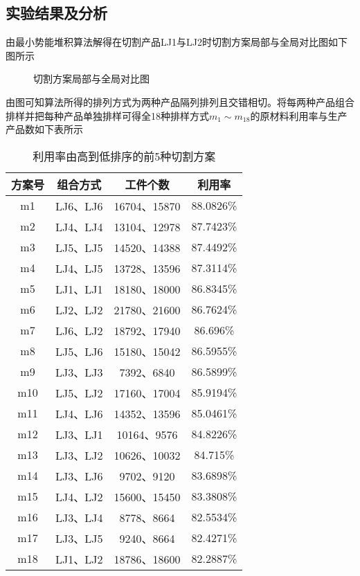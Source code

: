 \documentclass{whutmod}
\begin{document}
        \subsection{实验结果及分析}
        由最小势能堆积算法解得在切割产品LJ1与LJ2时切割方案局部与全局对比图如下图所示
        		\begin{figure}[H]
        	\centering
        	\caption{切割方案局部与全局对比图}\label{asdfsdf}
        \end{figure}
        由图可知算法所得的排列方式为两种产品隔列排列且交错相切。将每两种产品组合排样并把每种产品单独排样可得全18种排样方式$m_1\sim m_{18}$的原材料利用率与生产产品数如下表所示
			\begin{table}[H]
			\centering		
			\caption{利用率由高到低排序的前5种切割方案}
			\begin{tabular}{cccc}
			\toprule[2pt]
				\multicolumn{1}{m{2cm}}{\centering 方案号}
				& \multicolumn{1}{m{3cm}}{\centering 组合方式}
				& \multicolumn{1}{m{4cm}}{\centering 工件个数}
				& \multicolumn{1}{m{4cm}}{\centering 利用率}
				\\
				\midrule[1pt]
				m1 &  LJ6、LJ6&16704、15870&88.0826\%\\ 
				m2 &  LJ4、LJ4&13104、12978&87.7423\%\\ 
				m3 &  LJ5、LJ5&14520、14388&87.4492\%\\ 
				m4 &  LJ4、LJ5&13728、13596&87.3114\%\\ 
				m5 &  LJ1、LJ1&18180、18000&86.8345\%\\ 
				m6 &  LJ2、LJ2&21780、21600&86.7624\%\\ 
				m7 &  LJ6、LJ2&18792、17940&86.696\%\\ 
				m8 &  LJ5、LJ6&15180、15042&86.5955\%\\ 
				m9 &  LJ3、LJ3&7392、6840&86.5899\%\\ 
				m10 &  LJ5、LJ2&17160、17004&85.9194\%\\ 
				m11 &  LJ4、LJ6&14352、13596&85.0461\%\\ 
				m12 &  LJ3、LJ1&10164、9576&84.8226\%\\ 
				m13 &  LJ3、LJ2&10626、10032&84.715\%\\ 
				m14 &  LJ3、LJ6&9702、9120&83.6898\%\\ 
				m15 &  LJ4、LJ2&15600、15450&83.3808\%\\ 
				m16 &  LJ3、LJ4&8778、8664&82.5534\%\\ 
				m17 &  LJ3、LJ5&9240、8664&82.4271\%\\ 
				m18 &  LJ1、LJ2&18786、18600&82.2887\%\\ 
			\bottomrule[2pt]	
			\end{tabular}
			\end{table}
\end{document}
